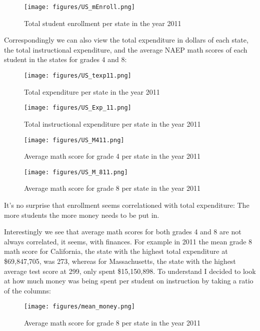 \documentclass[
]{article}
\begin{document}
\begin{figure}[!ht]
\centering
\texttt{[image: figures/US\_mEnroll.png]}
\caption{Total student enrollment per state in the year 2011}
\end{figure}


\newpage

Correspondingly we can also view the total expenditure in dollars of each state, the total instructional expenditure, and the average NAEP math scores of each student in the states for grades 4 and 8:

\begin{figure}[!ht]
	\centering
	\texttt{[image: figures/US\_texp11.png]}
	\caption{Total expenditure per state in the year 2011}
\end{figure}

\begin{figure}[!ht]
	\centering
	\texttt{[image: figures/US\_Exp\_11.png]}
	\caption{Total instructional expenditure per state in the year 2011}
\end{figure}

\begin{figure}[!ht]
	\centering
	\texttt{[image: figures/US\_M411.png]}
	\caption{Average math score for grade 4 per state in the year 2011}
\end{figure}

\begin{figure}[!ht]
	\centering
	\texttt{[image: figures/US\_M\_811.png]}
	\caption{Average math score for grade 8 per state in the year 2011}
\end{figure}
\newpage
It's no surprise that enrollment seems correlationed with total expenditure: The more students the more money needs to be put in. 
\clearpage
\newpage 

Interestingly we see that average math scores for both grades 4 and 8 are not always correlated, it seems, with finances. For example in 2011 the mean grade 8 math score for California, the state with the highest total expenditure at \$69,847,705, was 273, whereas for Massachusetts, the state with the highest average test score at 299, only spent \$15,150,898. To understand I decided to look at how much money was being spent per student on instruction by taking a ratio of the columns:
\begin{figure}[!ht]
	\centering
	\texttt{[image: figures/mean\_money.png]}
	\caption{Average math score for grade 8 per state in the year 2011}
\end{figure} 
\end{document}
